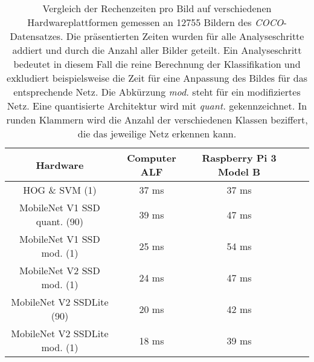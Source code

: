 \begin{table}[H]
	\caption{Vergleich der Rechenzeiten pro Bild auf verschiedenen Hardwareplattformen gemessen an 12755 Bildern des \textit{COCO}-Datensatzes. Die präsentierten Zeiten wurden für alle Analyseschritte addiert und durch die Anzahl aller Bilder geteilt. Ein Analyseschritt bedeutet in diesem Fall die reine Berechnung der Klassifikation und exkludiert beispielsweise die Zeit für eine Anpassung des Bildes für das entsprechende Netz. Die Abkürzung \textit{mod.} steht für ein modifiziertes Netz. Eine quantisierte Architektur wird mit \textit{quant.} gekennzeichnet. In runden Klammern wird die Anzahl der verschiedenen Klassen beziffert, die das jeweilige Netz erkennen kann.    }
	\begin{center}
		
	\begin{tabular}{|c|c|c|c|c|}
		\hline
		\multicolumn{1}{|c|}{Hardware} & \multicolumn{1}{c|}{Computer ALF}  & \multicolumn{1}{c|}{Raspberry Pi 3 Model B} \\ \hline
		HOG \& SVM (1)					&37 ms 				& 37 ms 	 \\
		MobileNet V1 SSD quant. (90)	&39	ms				&47	ms	 	 \\
		MobileNet V1 SSD mod. (1)		&25 ms				& 54 ms \\
		MobileNet V2 SSD mod. (1)		&24 ms 		 		&47 ms \\
		MobileNet V2 SSDLite (90)		&20 ms	 		&42 ms	 \\
		MobileNet V2 SSDLite mod. (1)	&18 ms					&39 ms \\
		
		\hline
	\end{tabular}
	\end{center}

	\label{fig: zeitentab}
\end{table}